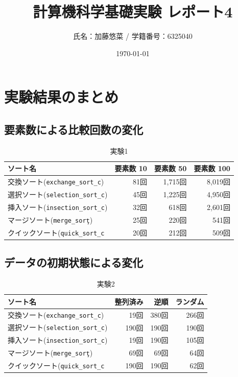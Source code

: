 \documentclass[titlepage]{ltjsarticle}
\title{計算機科学基礎実験 レポート4}
\author{氏名：加藤悠菜 / 学籍番号：6325040}
\date{\today}
\begin{document}
\maketitle

\section{実験結果のまとめ}
\subsection{要素数による比較回数の変化}

\begin{table}[htbp]
\centering
\caption{実験1}
\begin{tabular}{|l|r|r|r|}
\hline
ソート名&要素数 10&要素数 50&要素数 100\\\hline
交換ソート(\texttt{exchange\_sort\_c})&81回&1,715回&8,019回\\\hline
選択ソート(\texttt{selection\_sort\_c})&45回&1,225回&4,950回\\\hline
挿入ソート(\texttt{insection\_sort\_c})&32回&618回&2,601回\\\hline
マージソート(\texttt{merge\_sort\c})&25回&220回&541回\\\hline
クイックソート(\texttt{quick\_sort\_c}&20回&212回&509回\\
\hline
\end{tabular}
\end{table}

\subsection{データの初期状態による変化}

\begin{table}[htbp]
\centering
\caption{実験2}
\begin{tabular}{|l|r|r|r|}
\hline
ソート名&整列済み&逆順&ランダム\\\hline
交換ソート(\texttt{exchange\_sort\_c})&19回&380回&266回\\\hline
選択ソート(\texttt{selection\_sort\_c})&190回&190回&190回\\\hline
挿入ソート(\texttt{insection\_sort\_c})&19回&190回&105回\\\hline
マージソート(\texttt{merge\_sort\c})&69回&69回&64回\\\hline
クイックソート(\texttt{quick\_sort\_c}&190回&190回&62回\\
\hline
\end{tabular}
\end{table}
\end{document}
